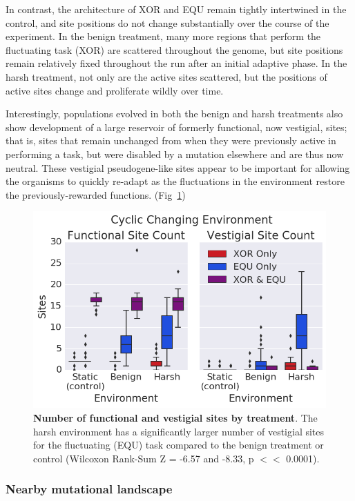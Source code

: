 \documentclass[PhD]{msu-thesis}
\begin{document}
In contrast, the architecture of XOR and EQU remain tightly intertwined in the control, and site positions do not change substantially over the course of the experiment. In the benign treatment, many more regions that perform the fluctuating task (XOR) are scattered throughout the genome, but site positions remain relatively fixed throughout the run after an initial adaptive phase. In the harsh treatment, not only are the active sites scattered, but the positions of active sites change and proliferate wildly over time.

Interestingly, populations evolved in both the benign and harsh treatments also show development of a large reservoir of formerly functional, now vestigial, sites; that is, sites that remain unchanged from when they were previously active in performing a task, but were disabled by a mutation elsewhere and are thus now neutral. These vestigial pseudogene-like sites appear to be important for allowing the organisms to quickly re-adapt as the fluctuations in the environment restore the previously-rewarded functions. (Fig~\ref{fig:CCE_func_vestigial})

	\begin{figure}[!h]
	\includegraphics[trim={0 0 0 0}, clip, width=0.75\columnwidth]{figures/CE/CCE_func_vest__box.png}
	\caption{\textbf{Number of functional and vestigial sites by treatment}. The harsh environment has a significantly larger number of vestigial sites for the fluctuating (EQU) task compared to the benign treatment or control (Wilcoxon Rank-Sum Z = -6.57 and -8.33, p $<<$ 0.0001).
	}
	\label{fig:CCE_func_vestigial} %
	\end{figure}

\subsubsection{Nearby mutational landscape}
\end{document}
